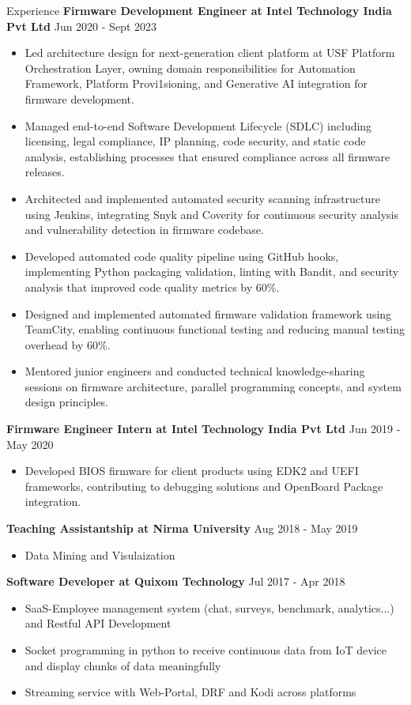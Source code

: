 \documentclass{resume} %
\begin{document}
\begin{rSection}{Experience}
{\textbf{Firmware Development Engineer at Intel Technology India Pvt Ltd}}  \hfill {Jun 2020 - Sept 2023}
\begin{itemize}
    \item Led architecture design for next-generation client platform at USF Platform Orchestration Layer, owning domain responsibilities for Automation Framework, Platform Provi1sioning, and Generative AI integration for firmware development.
    \item Managed end-to-end Software Development Lifecycle (SDLC) including licensing, legal compliance, IP planning, code security, and static code analysis, establishing processes that ensured compliance across all firmware releases.
    \item Architected and implemented automated security scanning infrastructure using Jenkins, integrating Snyk and Coverity for continuous security analysis and vulnerability detection in firmware codebase.
    \item Developed automated code quality pipeline using GitHub hooks, implementing Python packaging validation, linting with Bandit, and security analysis that improved code quality metrics by 60\%.
    \item Designed and implemented automated firmware validation framework using TeamCity, enabling continuous functional testing and reducing manual testing overhead by 60\%.
    \item Mentored junior engineers and conducted technical knowledge-sharing sessions on firmware architecture, parallel programming concepts, and system design principles.
\end{itemize}

{\textbf{Firmware Engineer Intern at Intel Technology India Pvt Ltd}}  \hfill {Jun 2019 - May 2020}
\begin{itemize}
    \item Developed BIOS firmware for client products using EDK2 and UEFI frameworks, contributing to debugging solutions and OpenBoard Package integration.
\end{itemize}

{\textbf{Teaching Assistantship at Nirma University}}  \hfill {Aug 2018 - May 2019}
\begin{itemize}
    \item Data Mining and Visulaization
\end{itemize}

{\textbf{Software Developer at Quixom Technology}}   \hfill {Jul 2017 - Apr 2018}
\begin{itemize}
    \item SaaS-Employee management system (chat, surveys, benchmark, analytics...) and Restful API Development
    \item Socket programming in python to receive continuous data from IoT device and display chunks of data meaningfully
    \item Streaming service with Web-Portal, DRF and Kodi across platforms
\end{itemize}


\end{rSection}
\end{document}
